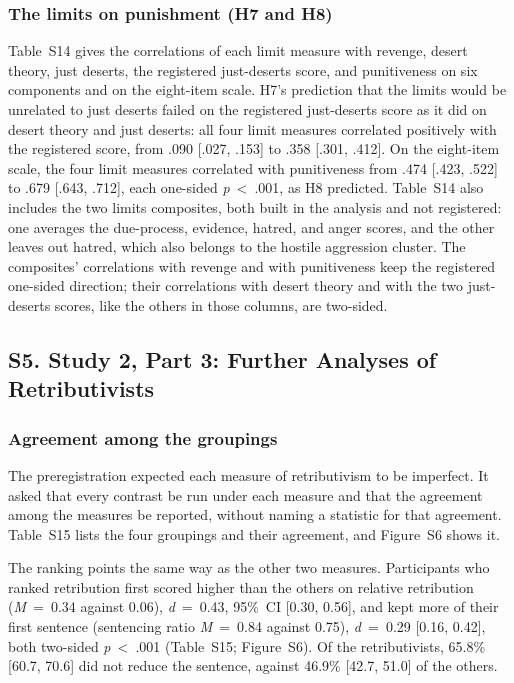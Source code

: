 \subsubsection{The limits on punishment (H7 and H8)}\label{the-limits-on-punishment-h7-and-h8}

Table~S14 gives the correlations of each limit measure with revenge, desert theory, just deserts, the registered just-deserts score, and punitiveness on six components and on the eight-item scale. H7's prediction that the limits would be unrelated to just deserts failed on the registered just-deserts score as it did on desert theory and just deserts: all four limit measures correlated positively with the registered score, from .090 {[}.027, .153{]} to .358 {[}.301, .412{]}. On the eight-item scale, the four limit measures correlated with punitiveness from .474 {[}.423, .522{]} to .679 {[}.643, .712{]}, each one-sided \emph{p}~\textless{}~.001, as H8 predicted. Table~S14 also includes the two limits composites, both built in the analysis and not registered: one averages the due-process, evidence, hatred, and anger scores, and the other leaves out hatred, which also belongs to the hostile aggression cluster. The composites' correlations with revenge and with punitiveness keep the registered one-sided direction; their correlations with desert theory and with the two just-deserts scores, like the others in those columns, are two-sided.

\subsection{S5. Study 2, Part 3: Further Analyses of Retributivists}\label{s5.-study-2-part-3-further-analyses-of-retributivists}

\subsubsection{Agreement among the groupings}\label{agreement-among-the-groupings}

The preregistration expected each measure of retributivism to be imperfect. It asked that every contrast be run under each measure and that the agreement among the measures be reported, without naming a statistic for that agreement. Table~S15 lists the four groupings and their agreement, and Figure~S6 shows it.

The ranking points the same way as the other two measures. Participants who ranked retribution first scored higher than the others on relative retribution (\emph{M}~=~0.34 against 0.06), \emph{d}~=~0.43, 95\%~CI {[}0.30, 0.56{]}, and kept more of their first sentence (sentencing ratio \emph{M}~=~0.84 against 0.75), \emph{d}~=~0.29 {[}0.16, 0.42{]}, both two-sided \emph{p}~\textless{}~.001 (Table~S15; Figure~S6). Of the retributivists, 65.8\% {[}60.7, 70.6{]} did not reduce the sentence, against 46.9\% {[}42.7, 51.0{]} of the others.

